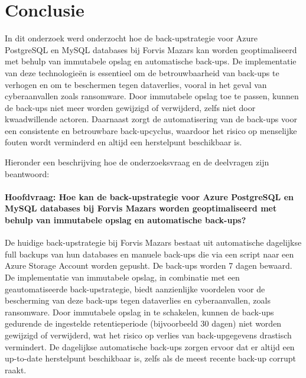 
\chapter{Conclusie}%
\label{ch:conclusie}

In dit onderzoek werd onderzocht hoe de back-upstrategie voor Azure PostgreSQL en MySQL databases bij Forvis Mazars kan worden geoptimaliseerd met behulp van immutabele opslag en automatische back-ups. De implementatie van deze technologieën is essentieel om de betrouwbaarheid van back-ups te verhogen en om te beschermen tegen dataverlies, vooral in het geval van cyberaanvallen zoals ransomware. Door immutabele opslag toe te passen, kunnen de back-ups niet meer worden gewijzigd of verwijderd, zelfs niet door kwaadwillende actoren. Daarnaast zorgt de automatisering van de back-ups voor een consistente en betrouwbare back-upcyclus, waardoor het risico op menselijke fouten wordt verminderd en altijd een herstelpunt beschikbaar is.

Hieronder een beschrijving hoe de onderzoeksvraag en de deelvragen zijn beantwoord:

\subsubsection{Hoofdvraag: Hoe kan de back-upstrategie voor Azure PostgreSQL en MySQL databases bij Forvis Mazars worden geoptimaliseerd met behulp van immutabele opslag en automatische back-ups?}

De huidige back-upstrategie bij Forvis Mazars bestaat uit automatische dagelijkse full backups van hun databases en manuele back-ups die via een script naar een Azure Storage Account worden gepusht. De back-ups worden 7 dagen bewaard. De implementatie van immutabele opslag, in combinatie met een geautomatiseerde back-upstrategie, biedt aanzienlijke voordelen voor de bescherming van deze back-ups tegen dataverlies en cyberaanvallen, zoals ransomware. Door immutabele opslag in te schakelen, kunnen de back-ups gedurende de ingestelde retentieperiode (bijvoorbeeld 30 dagen) niet worden gewijzigd of verwijderd, wat het risico op verlies van back-upgegevens drastisch vermindert. De dagelijkse automatische back-ups zorgen ervoor dat er altijd een up-to-date herstelpunt beschikbaar is, zelfs als de meest recente back-up corrupt raakt.

